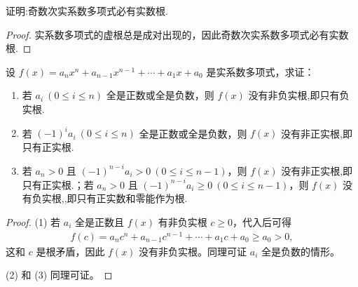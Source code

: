 \documentclass[../../main.tex]{subfiles}
\begin{document}
\begin{example}
证明:奇数次实系数多项式必有实数根.
\end{example}
\begin{proof}
实系数多项式的虚根总是成对出现的，因此奇数次实系数多项式必有实数根.
\end{proof}

\begin{proposition}\label{proposition:实系数多项式的根的符号判定准则}
设 $f(x) = a_n x^n + a_{n-1} x^{n-1} + \cdots + a_1 x + a_0$ 是实系数多项式，求证：
\begin{enumerate}[(1)]
\item 若 $a_i \ (0 \leq i \leq n)$ 全是正数或全是负数，则 $f(x)$ 没有非负实根,即只有负实根.
\item 若 $(-1)^i a_i \ (0 \leq i \leq n)$ 全是正数或全是负数，则 $f(x)$ 没有非正实根,即只有正实根.
\item 若 $a_n > 0$ 且 $(-1)^{n-i} a_i > 0 \ (0 \leq i \leq n-1)$，则 $f(x)$ 没有非正实根,即只有正实根.；若 $a_n > 0$ 且 $(-1)^{n-i} a_i \geq 0 \ (0 \leq i \leq n-1)$，则 $f(x)$ 没有负实根,,即只有正实数和零能作为根.
\end{enumerate}
\end{proposition}
\begin{proof}
(1) 若 $a_i$ 全是正数且 $f(x)$ 有非负实根 $c \geq 0$，代入后可得
\begin{align*}
f(c) = a_n c^n + a_{n-1} c^{n-1} + \cdots + a_1 c + a_0 \geq a_0 > 0,
\end{align*}
这和 $c$ 是根矛盾，因此 $f(x)$ 没有非负实根。同理可证 $a_i$ 全是负数的情形。

(2) 和 (3) 同理可证。
\end{proof}
\end{document}
